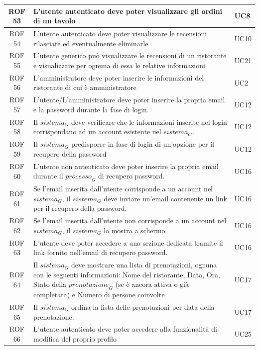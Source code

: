 \documentclass[12pt, oneside]{article}
\begin{document}
\begin{longtable}{|c|p{14cm}|p{2cm}|}
    ROF 53 & L'utente autenticato deve poter visualizzare gli ordini di un tavolo & UC8 \\
    \hline
    ROF 54 & L'utente autenticato deve poter visualizzare le recensioni rilasciate ed eventualmente eliminarle & UC10 \\
    \hline
    ROF 55 & L'utente generico può visualizzare le recensioni di un ristorante e visualizzare per ognuna di essa le relative informazioni & UC21 \\
    \hline
    ROF 56 & L'amministratore deve poter inserire le informazioni del ristorante di cui è amministratore & UC2 \\
    \hline
    ROF 57 & L'utente/L'amministratore deve poter inserire la propria email e la password durante la fase di login.  & UC12 \\
    \hline
    ROF 58 & Il $\textit{sistema}_G$ deve verificare che le informazioni inserite nel login corrispondano ad un account esistente nel $\textit{sistema}_G$.  & UC12 \\
    \hline
    ROF 59 & Il $\textit{sistema}_G$ predisporre in fase di login di un'opzione per il recupero della password  & UC12 \\
    \hline
    ROF 60 & L'utente non autenticato deve poter inserire la propria email durante il $\textit{processo}_G$ di recupero password.  & UC16 \\
    \hline
    ROF 61 & Se l'email inserita dall'utente corrisponde a un account nel $\textit{sistema}_G$, il $\textit{sistema}_G$ deve inviare un'email contenente un link per il recupero della password.  & UC16 \\
    \hline
    ROF 62 & Se l'email inserita dall'utente non corrisponde a un account nel $\textit{sistema}_G$, il $\textit{sistema}_G$ lo mostra a schermo.  & UC16 \\
    \hline
    ROF 63 & L'utente deve poter accedere a una sezione dedicata tramite il link fornito nell'email di recupero password.  & UC16 \\
    \hline
    ROF 64 & Il $\textit{sistema}_G$ deve mostrare una lista di prenotazioni, ognuna con le seguenti informazioni:
    Nome del ristorante, Data, Ora, Stato della $\textit{prenotazione}_G$ (se è ancora attiva o già completata) e Numero di persone coinvolte & UC17 \\
    \hline
    ROF 65 & Il $\textit{sistema}_G$ ordina la lista delle prenotazioni per data della prenotazione.  & UC17 \\
    \hline
    ROF 66 & L'utente autenticato deve poter accedere alla funzionalità di modifica del proprio profilo  & UC25 \\

\end{longtable}
\end{document}
